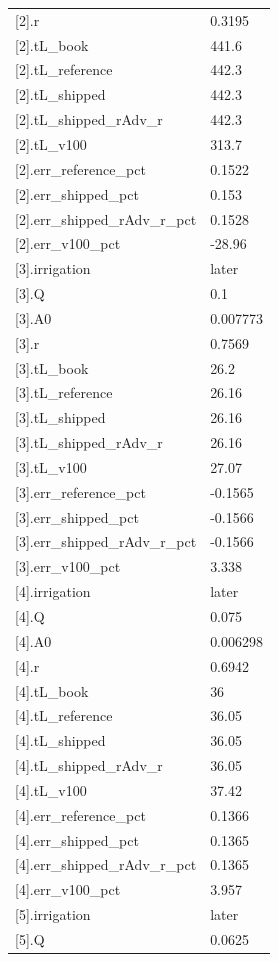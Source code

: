 {\begin{longtable}{p{}p{}}
{}[2].r & 0.3195\\
{}[2].tL\_book & 441.6\\
{}[2].tL\_reference & 442.3\\
{}[2].tL\_shipped & 442.3\\
{}[2].tL\_shipped\_rAdv\_r & 442.3\\
{}[2].tL\_v100 & 313.7\\
{}[2].err\_reference\_pct & 0.1522\\
{}[2].err\_shipped\_pct & 0.153\\
{}[2].err\_shipped\_rAdv\_r\_pct & 0.1528\\
{}[2].err\_v100\_pct & -28.96\\
{}[3].irrigation & later\\
{}[3].Q & 0.1\\
{}[3].A0 & 0.007773\\
{}[3].r & 0.7569\\
{}[3].tL\_book & 26.2\\
{}[3].tL\_reference & 26.16\\
{}[3].tL\_shipped & 26.16\\
{}[3].tL\_shipped\_rAdv\_r & 26.16\\
{}[3].tL\_v100 & 27.07\\
{}[3].err\_reference\_pct & -0.1565\\
{}[3].err\_shipped\_pct & -0.1566\\
{}[3].err\_shipped\_rAdv\_r\_pct & -0.1566\\
{}[3].err\_v100\_pct & 3.338\\
{}[4].irrigation & later\\
{}[4].Q & 0.075\\
{}[4].A0 & 0.006298\\
{}[4].r & 0.6942\\
{}[4].tL\_book & 36\\
{}[4].tL\_reference & 36.05\\
{}[4].tL\_shipped & 36.05\\
{}[4].tL\_shipped\_rAdv\_r & 36.05\\
{}[4].tL\_v100 & 37.42\\
{}[4].err\_reference\_pct & 0.1366\\
{}[4].err\_shipped\_pct & 0.1365\\
{}[4].err\_shipped\_rAdv\_r\_pct & 0.1365\\
{}[4].err\_v100\_pct & 3.957\\
{}[5].irrigation & later\\
{}[5].Q & 0.0625\\

\end{longtable}}
